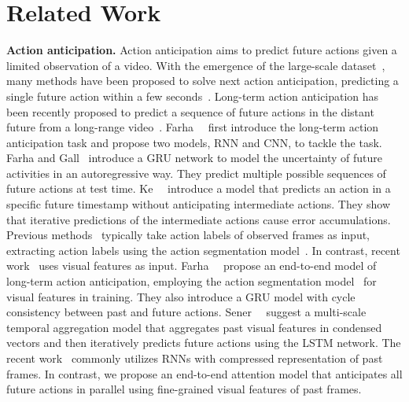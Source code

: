 
\section{Related Work}

\noindent \textbf{Action anticipation.}
Action anticipation aims to predict future actions given a limited observation of a video. 
With the emergence of the large-scale dataset~\cite{Damen2018EPICKITCHENS,damen2020rescaling}, many methods have been proposed to solve next action anticipation, predicting a single future action within a few seconds~\cite{furnari2019would,miech2019leveraging,fernando2021anticipating,girdhar2021anticipative,sener2020temporal,gammulle2019predicting,sener2019zero, roy2021action}.
Long-term action anticipation has been recently proposed to predict a sequence of future actions in the distant future from a long-range video~\cite{abu2018will,abu2019uncertainty,ke2019time,farha2020long,sener2020temporal}. 
Farha~\etal~\cite{abu2018will} first introduce the long-term action anticipation task and propose two models, RNN and CNN, to tackle the task.
Farha and Gall~\cite{abu2019uncertainty} introduce a GRU network to model the uncertainty of future activities in an autoregressive way. They predict multiple possible sequences of future actions at test time.
Ke~\etal~\cite{ke2019time} introduce a model that predicts an action in a specific future timestamp without anticipating intermediate actions.
They show that iterative predictions of the intermediate actions cause error accumulations.
Previous methods~\cite{abu2018will,ke2019time,abu2019uncertainty} typically take action labels of observed frames as input, extracting action labels using the action segmentation model~\cite{richard2017weakly}.
In contrast, recent work~\cite{farha2020long,sener2020temporal} uses visual features as input.
Farha~\etal~\cite{farha2020long} propose an end-to-end model of long-term action anticipation, employing the action segmentation model~\cite{farha2019ms} for visual features in training.
They also introduce a GRU model with cycle consistency between past and future actions. 
Sener~\etal~\cite{sener2020temporal} suggest a multi-scale temporal aggregation model 
that aggregates past visual features in condensed vectors and then iteratively predicts future actions using the LSTM network.
The recent work~\cite{farha2020long,sener2020temporal} commonly utilizes RNNs with compressed representation of past frames.
In contrast, we propose an end-to-end attention model that anticipates all future actions in parallel using fine-grained visual features of past frames.

